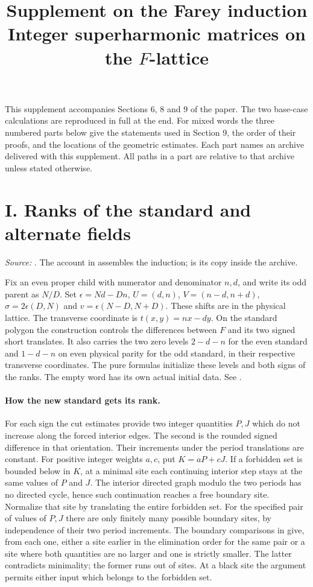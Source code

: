 \documentclass[11pt]{article}
\title{Supplement on the Farey induction\\[4pt]\large Integer superharmonic matrices on the $F$-lattice}
\author{}\date{}
\begin{document}
\maketitle
This supplement accompanies Sections 6, 8 and 9 of the paper. The two base-case calculations are reproduced in full at the end. For mixed words the three numbered parts below give the statements used in Section 9, the order of their proofs, and the locations of the geometric estimates. Each part names an archive delivered with this supplement. All paths in a part are relative to that archive unless stated otherwise.

\section*{I. Ranks of the standard and alternate fields}
\noindent\emph{Source:} . The account in  assembles the induction;  is its copy inside the archive.

Fix an even proper child with numerator and denominator $n,d$, and write its odd parent as $N/D$. Set $\epsilon=Nd-Dn$, $U=(d,n)$, $V=(n-d,n+d)$, $\sigma=2\epsilon(D,N)$ and $v=\epsilon(N-D,N+D)$. These shifts are in the physical lattice. The transverse coordinate is $t(x,y)=nx-dy$. On the standard polygon the construction controls the differences between $F$ and its two signed short translates. It also carries the two zero levels $2-d-n$ for the even standard and $1-d-n$ on even physical parity for the odd standard, in their respective transverse coordinates. The pure formulas initialize these levels and both signs of the ranks. The empty word has its own actual initial data. See .

\paragraph{How the new standard gets its rank.}
For each sign the cut estimates provide two integer quantities $P,J$ which do not increase along the forced interior edges. The second is the rounded signed difference in that orientation. Their increments under the period translations are constant. For positive integer weights $a,c$, put $K=aP+cJ$. If a forbidden set is bounded below in $K$, at a minimal site each continuing interior step stays at the same values of $P$ and $J$. The interior directed graph modulo the two periods has no directed cycle, hence such continuation reaches a free boundary site. Normalize that site by translating the entire forbidden set. For the specified pair of values of $P,J$ there are only finitely many possible boundary sites, by independence of their two period increments. The boundary comparisons in  give, from each one, either a site earlier in the elimination order for the same pair or a site where both quantities are no larger and one is strictly smaller. The latter contradicts minimality; the former runs out of sites. At a black site the argument permits either input which belongs to the forbidden set.
\end{document}
